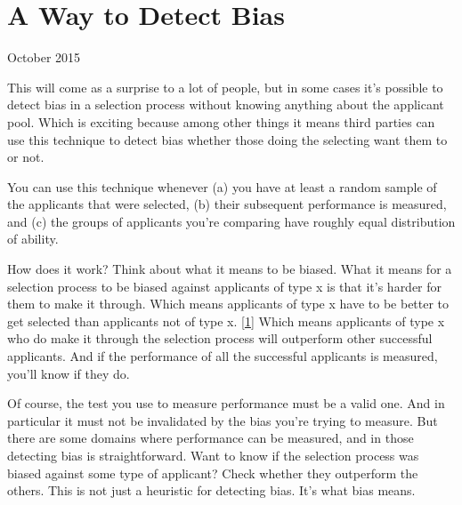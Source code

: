 \chapter{A Way to Detect Bias}


            
              
                

October 2015

This will come as a surprise to a lot
                  of people, but in some cases it's possible to detect bias in a
                  selection process without knowing anything about the applicant
                  pool. Which is exciting because among other things it means
                  third parties can use this technique to detect bias whether
                  those doing the selecting want them to or not.

You
                  can use this technique whenever (a) you have at least a random
                  sample of the applicants that were selected, (b) their
                  subsequent performance is measured, and (c) the groups of
                  applicants you're comparing have roughly equal distribution of
                  ability.

How does it work? Think about what it
                  means to be biased. What it means for a selection process to
                  be biased against applicants of type x is that it's harder for
                  them to make it through. Which means applicants of type x have
                  to be better to get selected than applicants not of type x.
                  [\href{\#f1n}{1}]
                  Which means applicants of type x who do make it through the
                  selection process will outperform other successful applicants.
                  And if the performance of all the successful applicants is
                  measured, you'll know if they do.

Of course, the
                  test you use to measure performance must be a valid one. And
                  in particular it must not be invalidated by the bias you're
                  trying to measure. But there are some domains where
                  performance can be measured, and in those detecting bias is
                  straightforward. Want to know if the selection process was
                  biased against some type of applicant? Check whether they
                  outperform the others. This is not just a heuristic for
                  detecting bias. It's what bias means.

